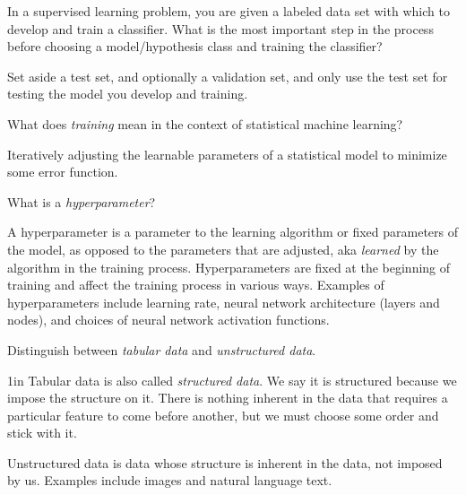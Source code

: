 \begin{questions}

\question In a supervised learning problem, you are given a labeled data set with which to develop and train a classifier.  What is the most important step in the process before choosing a model/hypothesis class and training the classifier?

\begin{solution}[1in]
Set aside a test set, and optionally a validation set, and only use the test set for testing the model you develop and training.
\end{solution}

\question What does {\it training} mean in the context of statistical machine learning?

\begin{solution}[1in]
Iteratively adjusting the learnable parameters of a statistical model to minimize some error function.
\end{solution}

\question What is a {\it hyperparameter}?

\begin{solution}[1in]
A hyperparameter is a parameter to the learning algorithm or fixed parameters of the model, as opposed to the parameters that are adjusted, aka {\it learned} by the algorithm in the training process.  Hyperparameters are fixed at the beginning of training and affect the training process in various ways.  Examples of hyperparameters include learning rate, neural network architecture (layers and nodes), and choices of neural network activation functions.
\end{solution}


\question Distinguish between {\it tabular data} and {\it unstructured data}.

\begin{solution}{1in}
Tabular data is also called {\it structured data}.  We say it is structured because we impose the structure on it.  There is nothing inherent in the data that requires a particular feature to come before another, but we must choose some order and stick with it.

Unstructured data is data whose structure is inherent in the data, not imposed by us.  Examples include images and natural language text.
\end{solution}

\end{questions}


